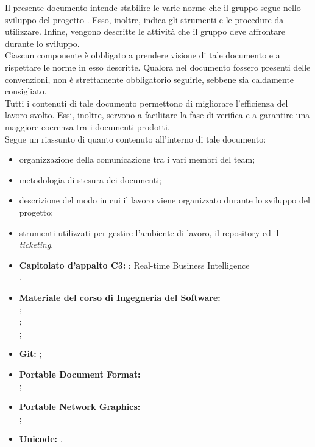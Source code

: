 		Il presente documento intende stabilire le varie norme che il gruppo \groupname{} segue nello sviluppo del progetto \projectname{}. Esso, inoltre, indica gli strumenti e le procedure da utilizzare. Infine, vengono descritte le attività che il gruppo deve affrontare durante lo sviluppo.\\
		Ciascun componente è obbligato a prendere visione di tale documento e a rispettare le norme in esso descritte. Qualora nel documento fossero presenti delle convenzioni, non è strettamente obbligatorio seguirle, sebbene sia caldamente consigliato.\\
		Tutti i contenuti di tale documento permettono di migliorare l’efficienza del lavoro svolto. Essi, inoltre, servono a facilitare la fase di verifica e a garantire una maggiore coerenza tra i documenti prodotti.\\
		Segue un riassunto di quanto contenuto all'interno di tale documento:
		\begin{itemize}
			\item organizzazione della comunicazione tra i vari membri del team;
			\item metodologia di stesura dei documenti;
			\item descrizione del modo in cui il lavoro viene organizzato durante lo sviluppo del progetto;
			\item strumenti utilizzati per gestire l'ambiente di lavoro, il repository ed il \textit{ticketing}.
		\end{itemize}

	
	

			\begin{itemize}
				\item\textbf{Capitolato d'appalto C3:} \projectname{}: Real-time Business Intelligence \\
					.
			\end{itemize}
			\begin{itemize}
				\item \textbf{Materiale del corso di Ingegneria del Software:} \\
					;\\
					; \\
					;
				\item \textbf{Git:} ;
				\item \textbf{Portable Document Format:} \\
					;
				\item \textbf{Portable Network Graphics:} \\
					;
				\item \textbf{Unicode:} .
			\end{itemize}
